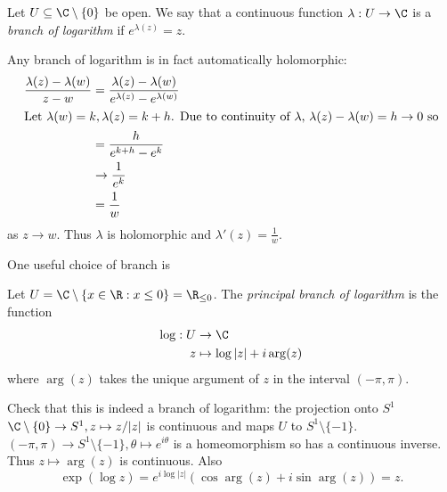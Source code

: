 \documentclass[a4paper]{article}
\begin{document}
\begin{definition}
  Let \(U \subseteq \C\setminus \{0\}\) be open. We say that a continuous function \(\lambda: U \to \C\) is a \emph{branch of logarithm} if \(e^{\lambda(z)} = z\).
\end{definition}

\begin{remark}
  Any branch of logarithm is in fact automatically holomorphic:
  \begin{align*}
    \frac{\lambda(z) - \lambda(w)}{z - w}
    &= \frac{\lambda(z) - \lambda(w)}{e^{\lambda(z)} - e^{\lambda(w)}} \\
    \intertext{Let \(\lambda(w) = k, \lambda(z) = k + h\). Due to continuity of \(\lambda\), \(\lambda(z) - \lambda(w) = h \to 0\) so}
    &= \frac{h}{e^{k + h} - e^k} \\
    &\to \frac{1}{e^k} \\
    &= \frac{1}{w}
  \end{align*}
  as \(z \to w\). Thus \(\lambda\) is holomorphic and \(\lambda'(z) = \frac{1}{w}\).

\end{remark}

One useful choice of branch is
\begin{definition}
  Let \(U = \C \setminus \{x \in \R: x\leq 0\} = \R_{\leq 0}\). The \emph{principal branch of logarithm} is the function
  \begin{align*}
    \log: U &\to \C \\
    z &\mapsto \log |z| + i \arg(z)
  \end{align*}
  where \(\arg(z)\) takes the unique argument of \(z\) in the interval \((-\pi, \pi)\).
\end{definition}

Check that this is indeed a branch of logarithm: the projection onto \(S^1\) \(\C \setminus \{0\} \to S^1, z \mapsto z/|z|\) is continuous and maps \(U\) to \(S^1 \setminus \{-1\}\). \((-\pi, \pi) \to S^1 \setminus \{-1\}, \theta \mapsto e^{i\theta}\) is a homeomorphism so has a continuous inverse. Thus \(z \mapsto \arg(z)\) is continuous. Also
\[
  \exp(\log z) = e^{i \log |z|}(\cos \arg(z) + i \sin \arg(z)) = z.
\]
\end{document}
